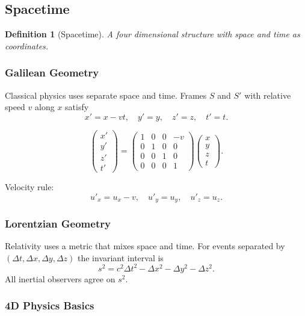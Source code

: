 \documentclass{article}
\newtheorem{definition}{Definition}
\begin{document}
\subsection{Spacetime}

\begin{definition}[Spacetime]
A four dimensional structure with space and time as coordinates.
\end{definition}

\subsubsection{Galilean Geometry}

Classical physics uses separate space and time. Frames \(S\) and \(S'\) with relative speed \(v\) along \(x\) satisfy
\[
x' = x - vt,\quad y' = y,\quad z' = z,\quad t' = t.
\]

\[
\begin{pmatrix}
x'\\ y'\\ z'\\ t'
\end{pmatrix}
=
\begin{pmatrix}
1 & 0 & 0 & -v\\
0 & 1 & 0 & 0\\
0 & 0 & 1 & 0\\
0 & 0 & 0 & 1
\end{pmatrix}
\begin{pmatrix}
x\\ y\\ z\\ t
\end{pmatrix}.
\]

Velocity rule:
\[
u'_x = u_x - v,\quad u'_y = u_y,\quad u'_z = u_z.
\]

\subsubsection{Lorentzian Geometry}

Relativity uses a metric that mixes space and time. For events separated by \((\Delta t,\Delta x,\Delta y,\Delta z)\) the invariant interval is
\[
s^2 = c^2\Delta t^2 - \Delta x^2 - \Delta y^2 - \Delta z^2.
\]
All inertial observers agree on \(s^2\).

\subsubsection{4D Physics Basics}
\end{document}
